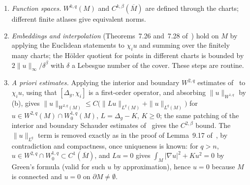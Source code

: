 \documentclass[11pt]{article}
\theoremstyle{plain}
\theoremstyle{definition}
\theoremstyle{remark}
\begin{document}
\begin{enumerate}[label=(\alph*)]
\item \emph{Function spaces.} \(W^{k,q}(M)\) and \(C^{k,\beta}(\overline M)\) are defined through the charts; different finite atlases give equivalent norms.
\item \emph{Embeddings and interpolation} (Theorems~7.26 and~7.28 of~\cite{GilbargTrudinger2001}) hold on \(M\) by applying the Euclidean statements to \(\chi_i u\) and summing over the finitely many charts; the H\"older quotient for points in different charts is bounded by \(2\|u\|_\infty/\delta^\beta\) with \(\delta\) a Lebesgue number of the cover. These steps are routine.
\item \emph{A priori estimates.} Applying the interior and boundary \(W^{2,q}\) estimates of~\cite[Ch.~9]{GilbargTrudinger2001} to \(\chi_i u\), using that \([\Delta_g,\chi_i]\) is a first-order operator, and absorbing \(\|u\|_{W^{1,q}}\) by (b), gives \(\|u\|_{W^{2,q}(M)}\le C\big(\|Lu\|_{L^q(M)}+\|u\|_{L^q(M)}\big)\) for \(u\in W^{2,q}(M)\cap W^{1,q}_0(M)\), \(L=\Delta_g-K\), \(K\ge 0\); the same patching of the interior and boundary Schauder estimates of~\cite[Ch.~6]{GilbargTrudinger2001} gives the \(C^{2,\beta}\) bound. The \(\|u\|_{L^q}\) term is removed exactly as in the proof of Lemma~9.17 of~\cite{GilbargTrudinger2001}, by contradiction and compactness, once uniqueness is known: for \(q>n\), \(u\in W^{2,q}\cap W^{1,q}_0\subset C^1(\overline M)\), and \(Lu=0\) gives \(\int_M|\nabla u|^2+Ku^2=0\) by Green's formula (valid for such \(u\) by approximation), hence \(u=0\) because \(M\) is connected and \(u=0\) on \(\partial M\neq\emptyset\).

\end{enumerate}
\end{document}
